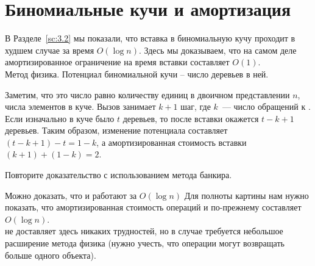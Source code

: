 \section{Биномиальные кучи и амортизация}
\label{sc:5.3}


\begin{frame}[fragile]{}
В Разделе~\ref{sc:3.2} мы показали, что вставка в биномиальную кучу
проходит в худшем случае за время $O(\log n)$. Здесь мы доказываем,
что на самом деле амортизированное ограничение на время вставки
составляет $O(1)$.\\

Метод физика. Потенциал биномиальной кучи -- число деревьев в ней. 

Заметим, что это число равно количеству
единиц в двоичном представлении $n$, числа элементов в куче.  Вызов
 занимает $k+1$ шаг, где $k$~--- число обращений к
. Если изначально в куче было $t$ деревьев, то после
вставки окажется $t - k + 1$ деревьев. Таким образом, изменение
потенциала составляет $(t - k + 1) - t = 1 - k$, а амортизированная
стоимость вставки $(k + 1) + (1 - k) = 2$.\\

\begin{exercise}\label{ex:5.2}
  Повторите доказательство с использованием метода банкира.
\end{exercise}

\end{frame}


\begin{frame}[fragile]{Можно доказать, что  и  работают за $O(\log n)$}
Для полноты картины нам нужно показать, что амортизированная стоимость
операций  и  по-прежнему
составляет $O(\log n)$.\\

  не доставляет здесь
никаких трудностей, но в случае  требуется небольшое
расширение метода физика (нужно учесть, что операции могут возвращать больше одного объекта). \\

\end{frame}

